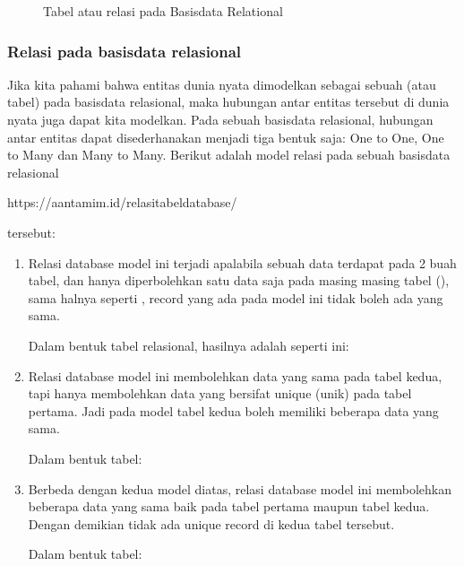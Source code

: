 \documentclass[letterpaper,10pt,english]{sphinxmanual}
\let\sphinxpxdimen\pdfpxdimen\else\newdimen\sphinxpxdimen
\begin{document}
\begin{figure}[htbp]
\centering
\capstart

\noindent\sphinxincludegraphics[height=300\sphinxpxdimen]{{2020-12-03-06-57-27}.png}
\caption{Tabel atau relasi pada Basisdata Relational}\label{\detokenize{sesi2/relationaldb:table}}\end{figure}


\subsubsection{Relasi pada basisdata relasional}
\label{\detokenize{sesi2/relationaldb:relasi-pada-basisdata-relasional}}
Jika kita pahami bahwa entitas dunia nyata dimodelkan sebagai sebuah  (atau tabel) pada basisdata relasional, maka hubungan antar entitas tersebut di dunia nyata juga dapat kita modelkan. Pada sebuah basisdata relasional, hubungan antar entitas dapat disederhanakan menjadi tiga bentuk saja: One to One, One to Many dan Many to Many. Berikut adalah model relasi pada sebuah basisdata relasional%
\begin{footnote}[1]\sphinxAtStartFootnote
https://aantamim.id/relasi\sphinxhyphen{}tabel\sphinxhyphen{}database/
%
\end{footnote} tersebut:
\begin{enumerate}
%
\item {} 
Relasi database model ini terjadi apalabila sebuah data terdapat pada 2 buah tabel, dan hanya diperbolehkan satu data saja pada masing masing tabel (), sama halnya seperti , record yang ada pada model ini tidak boleh ada yang sama.


Dalam bentuk tabel relasional, hasilnya adalah seperti ini:


\item {} 
Relasi database model  ini membolehkan data yang sama pada tabel kedua, tapi hanya membolehkan data yang bersifat unique (unik) pada tabel pertama. Jadi pada model tabel kedua boleh memiliki beberapa data yang sama.

Dalam bentuk tabel:

\item {} 
Berbeda dengan kedua model diatas, relasi database model ini membolehkan beberapa data yang sama baik pada tabel pertama maupun tabel kedua. Dengan demikian tidak ada unique record di kedua tabel tersebut.

Dalam bentuk tabel:

\end{enumerate}
\end{document}
